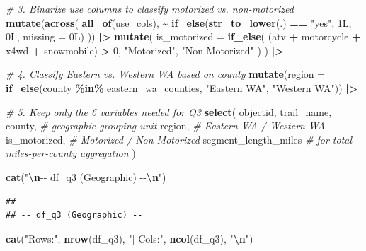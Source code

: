 \documentclass[
]{article}
\newenvironment{Shaded}{\begin{snugshade}}{\end{snugshade}}
\newcommand{\AttributeTok}[1]{\textcolor[rgb]{0.13,0.29,0.53}{#1}}
\newcommand{\CommentTok}[1]{\textcolor[rgb]{0.56,0.35,0.01}{\textit{#1}}}
\newcommand{\DataTypeTok}[1]{\textcolor[rgb]{0.13,0.29,0.53}{#1}}
\newcommand{\DecValTok}[1]{\textcolor[rgb]{0.00,0.00,0.81}{#1}}
\newcommand{\FunctionTok}[1]{\textcolor[rgb]{0.13,0.29,0.53}{\textbf{#1}}}
\newcommand{\NormalTok}[1]{#1}
\newcommand{\SpecialCharTok}[1]{\textcolor[rgb]{0.81,0.36,0.00}{\textbf{#1}}}
\newcommand{\StringTok}[1]{\textcolor[rgb]{0.31,0.60,0.02}{#1}}
\begin{document}
\begin{Shaded}
\begin{Highlighting}[]
  \CommentTok{\# 3. Binarize use columns to classify motorized vs. non{-}motorized}
  \FunctionTok{mutate}\NormalTok{(}\FunctionTok{across}\NormalTok{(}
    \FunctionTok{all\_of}\NormalTok{(use\_cols),}
    \SpecialCharTok{\textasciitilde{}} \FunctionTok{if\_else}\NormalTok{(}\FunctionTok{str\_to\_lower}\NormalTok{(.) }\SpecialCharTok{==} \StringTok{"yes"}\NormalTok{, }\DecValTok{1}\DataTypeTok{L}\NormalTok{, }\DecValTok{0}\DataTypeTok{L}\NormalTok{, }\AttributeTok{missing =} \DecValTok{0}\DataTypeTok{L}\NormalTok{)}
\NormalTok{  )) }\SpecialCharTok{|\textgreater{}}
  \FunctionTok{mutate}\NormalTok{(}
    \AttributeTok{is\_motorized =} \FunctionTok{if\_else}\NormalTok{(}
\NormalTok{      (atv }\SpecialCharTok{+}\NormalTok{ motorcycle }\SpecialCharTok{+}\NormalTok{ x4wd }\SpecialCharTok{+}\NormalTok{ snowmobile) }\SpecialCharTok{\textgreater{}} \DecValTok{0}\NormalTok{,}
      \StringTok{"Motorized"}\NormalTok{,}
      \StringTok{"Non{-}Motorized"}
\NormalTok{    )}
\NormalTok{  ) }\SpecialCharTok{|\textgreater{}}
  
  \CommentTok{\# 4. Classify Eastern vs. Western WA based on county}
  \FunctionTok{mutate}\NormalTok{(}\AttributeTok{region =} \FunctionTok{if\_else}\NormalTok{(county }\SpecialCharTok{\%in\%}\NormalTok{ eastern\_wa\_counties,}
                          \StringTok{"Eastern WA"}\NormalTok{, }\StringTok{"Western WA"}\NormalTok{)) }\SpecialCharTok{|\textgreater{}}
  
  \CommentTok{\# 5. Keep only the 6 variables needed for Q3}
  \FunctionTok{select}\NormalTok{(}
\NormalTok{    objectid,}
\NormalTok{    trail\_name,}
\NormalTok{    county,               }\CommentTok{\# geographic grouping unit}
\NormalTok{    region,               }\CommentTok{\# Eastern WA / Western WA}
\NormalTok{    is\_motorized,         }\CommentTok{\# Motorized / Non{-}Motorized}
\NormalTok{    segment\_length\_miles  }\CommentTok{\# for total{-}miles{-}per{-}county aggregation}
\NormalTok{  )}

\FunctionTok{cat}\NormalTok{(}\StringTok{"}\SpecialCharTok{\textbackslash{}n}\StringTok{{-}{-} df\_q3 (Geographic) {-}{-}}\SpecialCharTok{\textbackslash{}n}\StringTok{"}\NormalTok{)}
\end{Highlighting}
\end{Shaded}

\begin{verbatim}
## 
## -- df_q3 (Geographic) --
\end{verbatim}

\begin{Shaded}
\begin{Highlighting}[]
\FunctionTok{cat}\NormalTok{(}\StringTok{"Rows:"}\NormalTok{, }\FunctionTok{nrow}\NormalTok{(df\_q3), }\StringTok{"| Cols:"}\NormalTok{, }\FunctionTok{ncol}\NormalTok{(df\_q3), }\StringTok{"}\SpecialCharTok{\textbackslash{}n}\StringTok{"}\NormalTok{)}
\end{Highlighting}
\end{Shaded}
\end{document}

